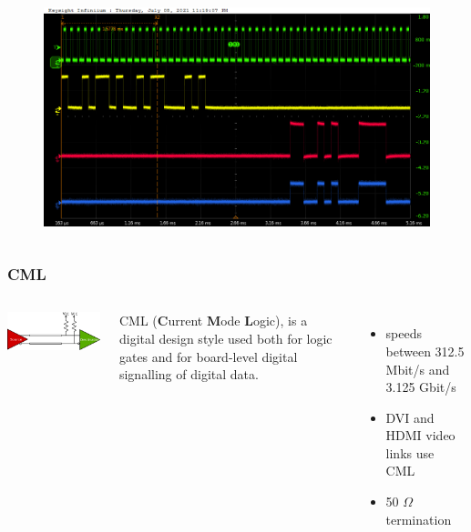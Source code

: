 \documentclass[aspectratio=169]{beamer}
\begin{document}
\begin{frame}[noframenumbering]
\begin{columns}
\begin{center}
\begin{figure}
				\caption{}
			\end{figure}
			\begin{figure}
				\includegraphics[width=0.95 \textwidth]{IMG/probe/09-08-2021_ch05-read60-baselinedac1.png}
				\caption{}
			\end{figure}	
		\end{center}
	\end{columns}
		\end{frame}
	
	\begin{frame}[noframenumbering]
		\frametitle{CML}
		\begin{columns}
			\begin{center}
				\includegraphics[width=0.95 \textwidth]{IMG/CML_line.png}
			\end{center}
			CML (\textbf{C}urrent \textbf{M}ode \textbf{L}ogic), is a digital design style used both for logic gates and for board-level digital signalling of digital data.
			\begin{itemize}
				\item speeds between 312.5 Mbit/s and 3.125 Gbit/s
				\item DVI and HDMI video links use CML
				\item 50 $\Omega$ termination
			\end{itemize}
		\end{columns}
	\end{frame}
\end{document}
